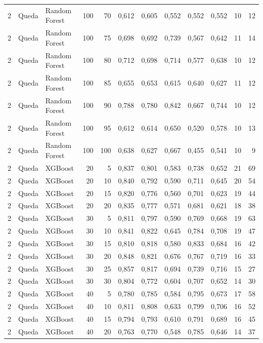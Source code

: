 \begin{longtable}{@{}rllrrrrrrrrr@{}}
2 & Queda & Random Forest & 100 & 70 & 0,612 & 0,605 & 0,552 & 0,552 & 0,552 & 10 & 12 \\
2 & Queda & Random Forest & 100 & 75 & 0,698 & 0,692 & 0,739 & 0,567 & 0,642 & 11 & 14 \\
2 & Queda & Random Forest & 100 & 80 & 0,712 & 0,698 & 0,714 & 0,577 & 0,638 & 10 & 12 \\
2 & Queda & Random Forest & 100 & 85 & 0,655 & 0,653 & 0,615 & 0,640 & 0,627 & 11 & 12 \\
2 & Queda & Random Forest & 100 & 90 & 0,788 & 0,780 & 0,842 & 0,667 & 0,744 & 10 & 12 \\
2 & Queda & Random Forest & 100 & 95 & 0,612 & 0,614 & 0,650 & 0,520 & 0,578 & 10 & 13 \\
2 & Queda & Random Forest & 100 & 100 & 0,638 & 0,627 & 0,667 & 0,455 & 0,541 & 10 & 9 \\
2 & Queda & XGBoost & 20 & 5 & 0,837 & 0,801 & 0,583 & 0,738 & 0,652 & 21 & 69 \\
2 & Queda & XGBoost & 20 & 10 & 0,840 & 0,792 & 0,590 & 0,711 & 0,645 & 20 & 54 \\
2 & Queda & XGBoost & 20 & 15 & 0,820 & 0,776 & 0,560 & 0,701 & 0,623 & 19 & 44 \\
2 & Queda & XGBoost & 20 & 20 & 0,835 & 0,777 & 0,571 & 0,681 & 0,621 & 18 & 38 \\
2 & Queda & XGBoost & 30 & 5 & 0,811 & 0,797 & 0,590 & 0,769 & 0,668 & 19 & 63 \\
2 & Queda & XGBoost & 30 & 10 & 0,841 & 0,822 & 0,645 & 0,784 & 0,708 & 19 & 47 \\
2 & Queda & XGBoost & 30 & 15 & 0,810 & 0,818 & 0,580 & 0,833 & 0,684 & 16 & 42 \\
2 & Queda & XGBoost & 30 & 20 & 0,848 & 0,821 & 0,676 & 0,767 & 0,719 & 16 & 33 \\
2 & Queda & XGBoost & 30 & 25 & 0,857 & 0,817 & 0,694 & 0,739 & 0,716 & 15 & 27 \\
2 & Queda & XGBoost & 30 & 30 & 0,804 & 0,772 & 0,604 & 0,707 & 0,652 & 14 & 30 \\
2 & Queda & XGBoost & 40 & 5 & 0,780 & 0,785 & 0,584 & 0,795 & 0,673 & 17 & 58 \\
2 & Queda & XGBoost & 40 & 10 & 0,811 & 0,808 & 0,633 & 0,799 & 0,706 & 16 & 52 \\
2 & Queda & XGBoost & 40 & 15 & 0,794 & 0,793 & 0,610 & 0,791 & 0,689 & 16 & 45 \\
2 & Queda & XGBoost & 40 & 20 & 0,763 & 0,770 & 0,548 & 0,785 & 0,646 & 14 & 37 \\

\end{longtable}
